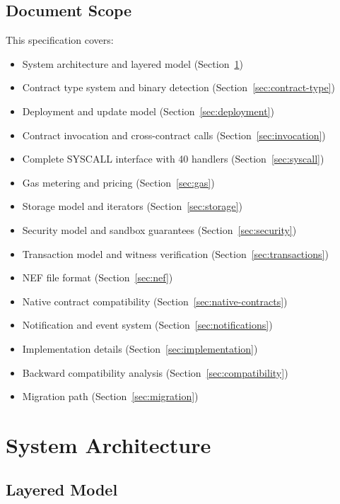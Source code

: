 \documentclass[11pt,a4paper]{article}
\begin{document}
\subsection{Document Scope}

This specification covers:
\begin{itemize}[noitemsep]
    \item System architecture and layered model (Section~\ref{sec:architecture})
    \item Contract type system and binary detection (Section~\ref{sec:contract-type})
    \item Deployment and update model (Section~\ref{sec:deployment})
    \item Contract invocation and cross-contract calls (Section~\ref{sec:invocation})
    \item Complete SYSCALL interface with 40 handlers (Section~\ref{sec:syscall})
    \item Gas metering and pricing (Section~\ref{sec:gas})
    \item Storage model and iterators (Section~\ref{sec:storage})
    \item Security model and sandbox guarantees (Section~\ref{sec:security})
    \item Transaction model and witness verification (Section~\ref{sec:transactions})
    \item NEF file format (Section~\ref{sec:nef})
    \item Native contract compatibility (Section~\ref{sec:native-contracts})
    \item Notification and event system (Section~\ref{sec:notifications})
    \item Implementation details (Section~\ref{sec:implementation})
    \item Backward compatibility analysis (Section~\ref{sec:compatibility})
    \item Migration path (Section~\ref{sec:migration})
\end{itemize}

\section{System Architecture}
\label{sec:architecture}

\subsection{Layered Model}
\end{document}
